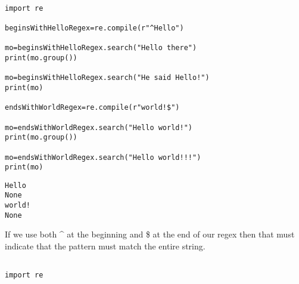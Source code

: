 \documentclass[11pt]{article}
\begin{document}
\begin{verbatim}

import re

beginsWithHelloRegex=re.compile(r"^Hello")

mo=beginsWithHelloRegex.search("Hello there")
print(mo.group())

mo=beginsWithHelloRegex.search("He said Hello!")
print(mo)

endsWithWorldRegex=re.compile(r"world!$")

mo=endsWithWorldRegex.search("Hello world!")
print(mo.group())

mo=endsWithWorldRegex.search("Hello world!!!")
print(mo)

\end{verbatim}

\begin{verbatim}
Hello
None
world!
None
\end{verbatim}


If we use both \^{} at the beginning and \$ at the end of our regex then that must indicate that the pattern must match the entire string.

\begin{verbatim}

import re


\end{verbatim}
\end{document}

